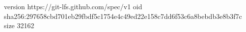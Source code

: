 version https://git-lfs.github.com/spec/v1
oid sha256:297658cbd701eb29fbdf5c1754e4c49ed22e158c7dd6f53c6a8bebdb3e8b3f7c
size 32162

